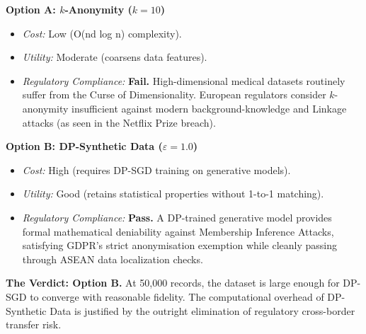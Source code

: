\begin{tcolorbox}[scorecardbox, title={Sovereign AI Scorecard Evaluation}]
\textbf{Option A: $k$-Anonymity ($k=10$)}
\begin{itemize}
    \item \textit{Cost:} Low (O(nd log n) complexity).
    \item \textit{Utility:} Moderate (coarsens data features).
    \item \textit{Regulatory Compliance:} \textbf{Fail.} High-dimensional medical datasets routinely suffer from the Curse of Dimensionality. European regulators consider $k$-anonymity insufficient against modern background-knowledge and Linkage attacks (as seen in the Netflix Prize breach).
\end{itemize}

\textbf{Option B: DP-Synthetic Data ($\varepsilon = 1.0$)}
\begin{itemize}
    \item \textit{Cost:} High (requires DP-SGD training on generative models).
    \item \textit{Utility:} Good (retains statistical properties without 1-to-1 matching).
    \item \textit{Regulatory Compliance:} \textbf{Pass.} A DP-trained generative model provides formal mathematical deniability against Membership Inference Attacks, satisfying GDPR's strict anonymisation exemption while cleanly passing through ASEAN data localization checks.
\end{itemize}

\textbf{The Verdict: Option B.} 
At 50,000 records, the dataset is large enough for DP-SGD to converge with reasonable fidelity. The computational overhead of DP-Synthetic Data is justified by the outright elimination of regulatory cross-border transfer risk.
\end{tcolorbox}
